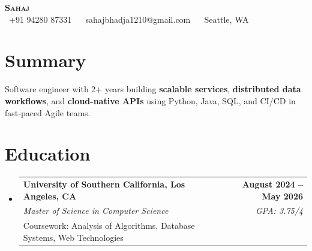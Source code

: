 \documentclass[letterpaper,10pt]{article}
\makeatletter
\newcommand{\resumeEduSubheading}[5]{\vspace{-1pt}\item\begin{tabular*}{1.0\textwidth}[t]{l@{\extracolsep{\fill}}r}\textbf{#1} & \textbf{\small #2} \\\textit{\small #3} & \textit{\small #4} \\\small #5 & \\\end{tabular*}\vspace{-2pt}}
\newcommand{\resumeSubHeadingListStart}{\begin{itemize}[leftmargin=0.0in, label={}]}
\newcommand{\resumeSubHeadingListEnd}{\end{itemize}}
\makeatother
\begin{document}
\begin{center}
{\Huge \scshape \textbf{Sahaj}} \\ \vspace{1pt}
\small \faPhone\ +91 94280 87331 ~ \faEnvelope\ sahajbhadja1210@gmail.com ~ \faMapMarker*\ Seattle, WA
\end{center}
\vspace{-20pt}
\section{Summary}
\begin{itemize}[leftmargin=0.15in, label={}]
\small{\item{Software engineer with 2+ years building \textbf{scalable services}, \textbf{distributed data workflows}, and \textbf{cloud-native APIs} using Python, Java, SQL, and CI/CD in fast-paced Agile teams.}}
\end{itemize}
\vspace{-18pt}
\section{Education}
\resumeSubHeadingListStart
\resumeEduSubheading{University of Southern California, Los Angeles, CA}{August 2024 -- May 2026}{Master of Science in Computer Science}{GPA: 3.75/4}{Coursework: Analysis of Algorithms, Database Systems, Web Technologies}
\resumeSubHeadingListEnd
\vspace{-20pt}
\end{document}
